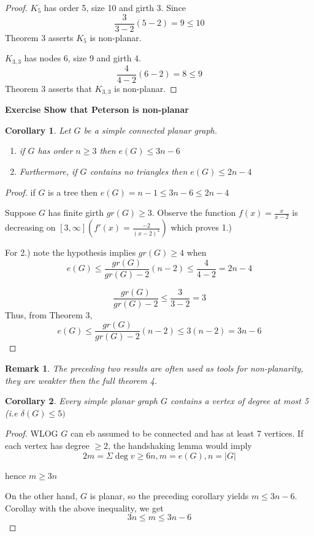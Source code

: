 \documentclass[12pt]{article}
\newtheorem*{corollary}{Corollary}
\newtheorem*{remark}{Remark}
\begin{document}
\begin{proof}

	$K_{5}$ has order 5, size 10 and girth 3. Since
	\[\frac{3}{3-2}(5-2) = 9 \le 10\]
	Theorem 3 asserts $K_{5}$ is non-planar.

	$K_{3,3}$ has nodes 6, size 9 and girth 4.
	\[\frac{4}{4-2}(6-2) = 8 \le 9\]
	Theorem 3 asserts that $K_{3,3}$ is non-planar.
\end{proof}


\textbf{Exercise Show that Peterson is non-planar}


\begin{corollary}
	Let $G$ be a simple connected planar graph.
	\begin{enumerate}
		\item if $G$ has order $n\ge 3$ then $e(G) \le 3n - 6$
		\item Furthermore, if $G$ contains no triangles then $e(G) \le 2n - 4$
	\end{enumerate}

\end{corollary}

\begin{proof}

	if $G$ is a tree then $e(G) = n-1\le 3n-6\le 2n-4$


	Suppose $G$ has finite girth $gr(G)\ge 3$. Observe the function $f(x) = \frac{x}{x-2}$ is decreasing on $[3,\infty] (f'(x) = \frac{-2}{(x-2)^{2}})$
	which proves 1.)

	For 2.) note the hypothesis implies $gr(G) \ge 4$ when
	\[e(G) \le \frac{gr(G)}{gr(G)-2} (n-2) \le \frac{4}{4-2} = 2n-4\]

	\[\frac{gr(G)}{gr(G)-2}\le \frac{3}{3-2} = 3\]
	Thus, from Theorem 3,
	\[e(G) \le \frac{gr(G)}{gr(G) - 2} (n-2) \le 3(n-2) = 3n-6\]
\end{proof}


\begin{remark}
	The preceding two results are often used as tools for non-planarity, they are weakter then the full theorem 4.
\end{remark}


\begin{corollary}
	Every simple planar graph $G$ contains a vertex of degree at most 5 (i.e $\delta(G) \le 5)$
\end{corollary}

\begin{proof}
	WLOG $G$ can eb assumed to be connected and has at least 7 vertices. If each vertex has degree $\ge 2$, the handshaking lemma would imply
	\[2m = \Sigma \deg v \ge 6n, m = e(G), n = \vert G\vert\]

	hence $m\ge 3n$

	On the other hand, $G$ is planar, so the preceding corollary yields $m\le 3n-6$. Corollay with the above inequality, we get
	\[3n \le m \le 3n-6\]


\end{proof}
\end{document}
